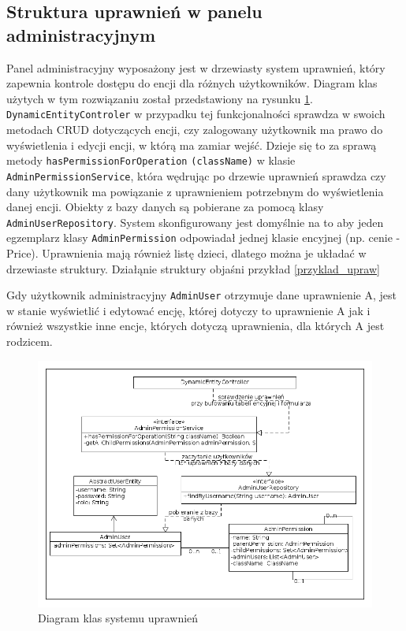 \subsection{Struktura uprawnień w panelu administracyjnym}
Panel administracyjny wyposażony jest w drzewiasty system uprawnień, który zapewnia kontrole dostępu do encji dla różnych użytkowników. Diagram klas użytych w tym rozwiązaniu został przedstawiony na rysunku \ref{klasy_uprawnienia}. \texttt{DynamicEntityControler} w przypadku tej funkcjonalności sprawdza w swoich metodach CRUD dotyczących encji, czy zalogowany użytkownik ma prawo do wyświetlenia i edycji encji, w którą ma zamiar wejść. Dzieje się to za sprawą metody \texttt{hasPermissionForOperation}
\texttt{(className)} w klasie \texttt{AdminPermissionService}, która wędrując po drzewie uprawnień sprawdza czy dany użytkownik ma powiązanie z uprawnieniem potrzebnym do wyświetlenia danej encji. Obiekty z bazy danych są pobierane za pomocą klasy \texttt{AdminUserRepository}. System skonfigurowany jest domyślnie na to aby jeden egzemplarz klasy \texttt{AdminPermission} odpowiadał jednej klasie encyjnej (np. cenie - Price). Uprawnienia mają również listę dzieci, dlatego można je układać w drzewiaste struktury. Działąnie struktury objaśni przykład \ref{przyklad_upraw}
\begin{example}
	\label{przyklad_upraw}
	Gdy użytkownik administracyjny \texttt{AdminUser} otrzymuje dane uprawnienie A, jest w stanie wyświetlić i edytować encję, której dotyczy to uprawnienie A jak i również wszystkie inne encje, których dotyczą uprawnienia, dla których A jest rodzicem. 
\end{example}
\begin{figure}
	\begin{center}
		\includegraphics[scale=0.4]{klasy_uprawnienia.png}
	\end{center}
	\caption{{\color{black}Diagram klas systemu uprawnień}} \label{klasy_uprawnienia}
\end{figure}

